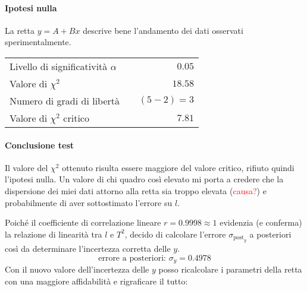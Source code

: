 \documentclass{article}
\begin{document}
	\paragraph{Ipotesi nulla} La retta $y = A + Bx$ descrive bene l'andamento dei dati osservati sperimentalmente.
	
	\vspace{0.7cm}
	\begin{table}[H]
		\centering
		\begin{tabular}{lr} 
			Livello di significatività $\alpha$		&$\quad 0.05$  \\
			Valore di $\chi ^2$             	& $\quad 18.58$       \\
			Numero di gradi di libertà      	& $\quad (5-2) = 3$         \\   
			Valore di $\chi ^2$ critico     	& $\quad 7.81$
		\end{tabular}
	\end{table}
	\vspace{0.7cm}
	
	\paragraph{Conclusione test} Il valore del $\chi^2$ ottenuto risulta essere maggiore del valore critico, rifiuto quindi l'ipotesi nulla. Un valore di chi quadro così elevato mi porta a credere che la dispersione dei miei dati attorno alla retta sia troppo elevata (\textcolor{red}{causa?}) e probabilmente di aver sottostimato l'errore su $l$. 
	
	Poiché il coefficiente di correlazione lineare $r = 0.9998 \approx 1$ evidenzia (e conferma) la relazione di linearità tra $l$ e $T^2$, decido di calcolare l'errore $\sigma_{\text{post}_y}$ a  posteriori così da determinare l'incertezza corretta delle $y$.
	\[
	\text{errore a posteriori: } \sigma_y = 0.4978
	\]	
	Con il nuovo valore dell'incertezza delle $y$ posso ricalcolare i parametri della retta con una maggiore affidabilità e rigraficare il tutto:
	
\end{document}
